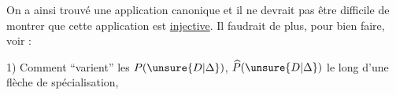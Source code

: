  On a ainsi trouvé une application canonique
et il ne devrait pas être difficile de montrer que cette application est \uline{injective}. Il faudrait de plus, pour bien faire, voir :

1) Comment ``varient'' les $P(\unsure{D|\Delta})$, $\widehat P(\unsure{D|\Delta})$ le long d'une flèche de spécialisation,
